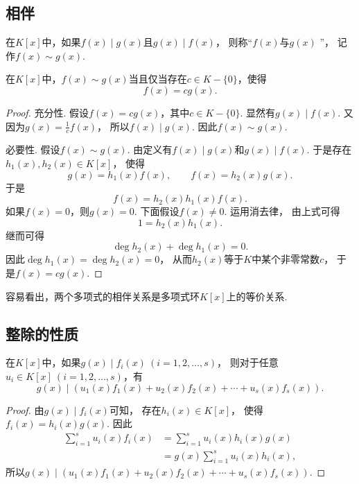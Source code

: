 \subsection{相伴}
\begin{definition}
在\(K[x]\)中，如果\(f(x) \mid g(x)\)且\(g(x) \mid f(x)\)，
则称“\(f(x)\)与\(g(x)\) ”，
记作\(f(x) \sim g(x)\).
\end{definition}

\begin{proposition}
在\(K[x]\)中，\(f(x) \sim g(x)\)当且仅当存在\(c \in K-\{0\}\)，使得\[
	f(x) = c g(x).
\]
\begin{proof}
充分性.
假设\(f(x)=c g(x)\)，其中\(c \in K-\{0\}\).
显然有\(g(x) \mid f(x)\).
又因为\(g(x)=\frac1c f(x)\)，
所以\(f(x) \mid g(x)\).
因此\(f(x) \sim g(x)\).

必要性.
假设\(f(x) \sim g(x)\).
由定义有\(f(x) \mid g(x)\)和\(g(x) \mid f(x)\).
于是存在\(h_1(x),h_2(x) \in K[x]\)，
使得\[
	g(x) = h_1(x) f(x), \qquad
	f(x) = h_2(x) g(x).
\]
于是\[
	f(x) = h_2(x) h_1(x) f(x).
\]
如果\(f(x)=0\)，则\(g(x)=0\).
下面假设\(f(x)\neq0\).
运用消去律，
由上式可得\[
	1 = h_2(x) h_1(x).
\]
继而可得\[
	\deg h_2(x) + \deg h_1(x) = 0.
\]
因此\(\deg h_1(x) = \deg h_2(x) = 0\)，
从而\(h_2(x)\)等于\(K\)中某个非零常数\(c\)，
于是\(f(x) = c g(x)\).
\end{proof}
\end{proposition}

容易看出，两个多项式的相伴关系是多项式环\(K[x]\)上的等价关系.

\subsection{整除的性质}
\begin{proposition}\label{theorem:多项式.整除的线性性}
在\(K[x]\)中，如果\(g(x) \mid f_i(x)\ (i=1,2,\dotsc,s)\)，
则对于任意\(u_i \in K[x]\ (i=1,2,\dotsc,s)\)，有\[
	g(x) \mid (u_1(x) f_1(x) + u_2(x) f_2(x) + \dotsb + u_s(x) f_s(x)).
\]
\begin{proof}
由\(g(x) \mid f_i(x)\)可知，
存在\(h_i(x) \in K[x]\)，
使得\(f_i(x) = h_i(x) g(x)\).
因此\begin{align*}
	\sum_{i=1}^s u_i(x) f_i(x)
	&= \sum_{i=1}^s u_i(x) h_i(x) g(x) \\
	&= g(x) \sum_{i=1}^s u_i(x) h_i(x),
\end{align*}
所以\(g(x) \mid (u_1(x) f_1(x) + u_2(x) f_2(x) + \dotsb + u_s(x) f_s(x))\).
\end{proof}
\end{proposition}

